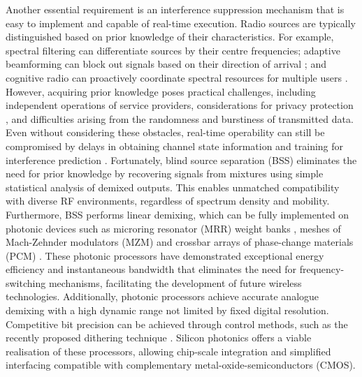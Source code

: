 \documentclass[pdflatex,mathphys]{sty}%
\begin{document}
Another essential requirement is an interference suppression mechanism that is easy to implement and capable of real-time execution. Radio sources are typically distinguished based on prior knowledge of their characteristics. For example, spectral filtering can differentiate sources by their centre frequencies; adaptive beamforming can block out signals based on their direction of arrival \cite{kutty2015beamforming, li2005robust}; and cognitive radio can proactively coordinate spectral resources for multiple users \cite{akyildiz2006next,haykin2005cognitive}. However, acquiring prior knowledge poses practical challenges, including independent operations of service providers, considerations for privacy protection \cite{fragkiadakis2012survey,clancy2008security,acquisti2006there}, and difficulties arising from the randomness and burstiness of transmitted data. Even without considering these obstacles, real-time operability can still be compromised by delays in obtaining channel state information and training for interference prediction \cite{selvi2018markov,biguesh2006training}. Fortunately, blind source separation (BSS) \cite{naik2014blind,choi2005blind} eliminates the need for prior knowledge by recovering signals from mixtures using simple statistical analysis of demixed outputs. This enables unmatched compatibility with diverse RF environments, regardless of spectrum density and mobility. Furthermore, BSS performs linear demixing, which can be fully implemented on photonic devices such as microring resonator (MRR) weight banks \cite{de2022design,zhang2022silicon,tait2016microring}, meshes of Mach-Zehnder modulators (MZM) \cite{perez2020multipurpose,perez2017multipurpose,clements2016optimal} and crossbar arrays of phase-change materials (PCM) \cite{fang2022ultra, feldmann2021parallel}. These photonic processors have demonstrated exceptional energy efficiency \cite{tait2022quantifying} and instantaneous bandwidth \cite{marpaung2019integrated,khan2010ultrabroad} that eliminates the need for frequency-switching mechanisms, facilitating the development of future wireless technologies. Additionally, photonic processors achieve accurate analogue demixing with a high dynamic range not limited by fixed digital resolution. Competitive bit precision can be achieved through control methods, such as the recently proposed dithering technique \cite{zhang2022silicon}. Silicon photonics offers a viable realisation of these processors, allowing chip-scale integration and simplified interfacing compatible with complementary metal-oxide-semiconductors (CMOS).
\end{document}
